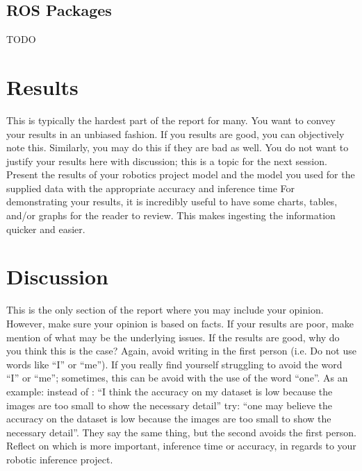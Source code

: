 \documentclass[10pt,journal,compsoc]{IEEEtran}
\begin{document}
\subsection{ROS Packages}

TODO


\section{Results}
This is typically the hardest part of the report for many. You want to convey your results in an unbiased fashion. If you results are good, you can objectively note this. Similarly, you may do this if they are bad as well. You do not want to justify your results here with discussion; this is a topic for the next session. 
Present the results of your robotics project model and the model you used for the supplied data with the appropriate accuracy and inference time
For demonstrating your results, it is incredibly useful to have some charts, tables, and/or graphs for the reader to review. This makes ingesting the information quicker and easier.

\section{Discussion}
This is the only section of the report where you may include your opinion. However, make sure your opinion is based on facts. If your results are poor, make mention of what may be the underlying issues. If the results are good, why do you think this is the case? Again, avoid writing in the first person (i.e. Do not use words like “I” or “me”). If you really find yourself struggling to avoid the word “I” or “me”; sometimes, this can be avoid with the use of the word “one”. As an example: instead of : “I think the accuracy on my dataset is low because the images are too small to show the necessary detail” try: “one may believe the accuracy on the dataset is low because the images are too small to show the necessary detail”. They say the same thing, but the second avoids the first person. 
Reflect on which is more important, inference time or accuracy, in regards to your robotic inference project.
\end{document}
